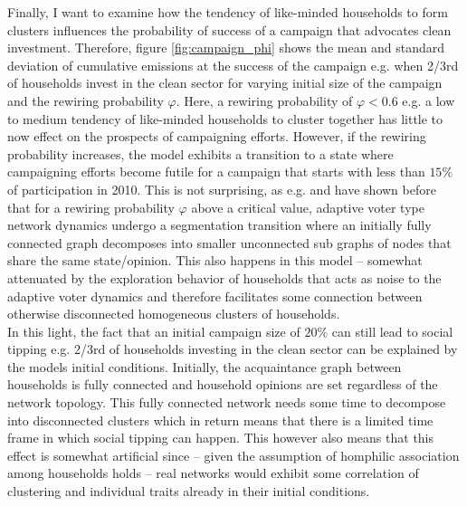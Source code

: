 Finally, I want to examine how the tendency of like-minded households to form clusters influences the probability of success of a campaign that advocates clean investment. Therefore, figure \ref{fig:campaign_phi} shows the mean and standard deviation of cumulative emissions at the success of the campaign e.g. when 2/3rd of households invest in the clean sector for varying initial size of the campaign and the rewiring probability $\varphi$. Here, a rewiring probability of $\varphi<0.6$ e.g. a low to medium tendency of like-minded households to cluster together has little to now effect on the prospects of campaigning efforts. However, if the rewiring probability increases, the model exhibits a transition to a state where campaigning efforts become futile for a campaign that starts with less than $15\%$ of participation in 2010. This is not surprising, as e.g. \cite{Rogers2013, Wiedermann2015} and \cite{Klamser2016} have shown before that for a rewiring probability $\varphi$ above a critical value, adaptive voter type network dynamics undergo a segmentation transition where an initially fully connected graph decomposes into smaller unconnected sub graphs of nodes that share the same state/opinion. This also happens in this model -- somewhat attenuated by the exploration behavior of households that acts as noise to the adaptive voter dynamics and therefore facilitates some connection between otherwise disconnected homogeneous clusters of households.\\

In this light, the fact that an initial campaign size of $20\%$ can still lead to social tipping e.g. 2/3rd of households investing in the clean sector can be explained by the models initial conditions. Initially, the acquaintance graph between households is fully connected and household opinions are set regardless of the network topology. This fully connected network needs some time to decompose into disconnected clusters which in return means that there is a limited time frame in which social tipping can happen. This however also means that this effect is somewhat artificial since -- given the assumption of homphilic association among households holds -- real networks would exhibit some correlation of clustering and individual traits already in their initial conditions.\\

